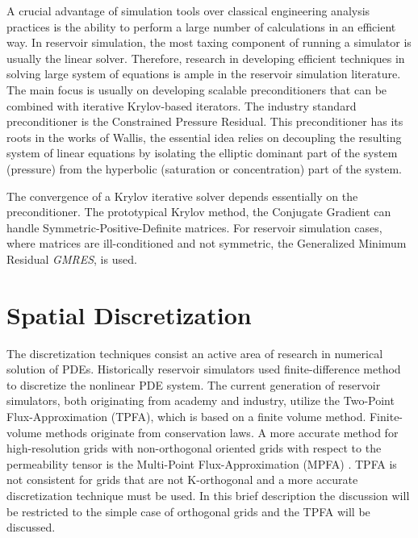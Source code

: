 A crucial advantage of simulation tools over classical engineering analysis practices is the ability
to perform a large number of calculations in an efficient way. In reservoir simulation, the most taxing
component of running a simulator is usually the linear solver. Therefore, research in developing efficient
techniques in solving large system of equations is ample in the reservoir simulation literature. The main
focus is usually on developing scalable preconditioners that can be combined with iterative Krylov-based 
iterators. The industry standard preconditioner is the Constrained Pressure Residual. This preconditioner
has its roots in the works of Wallis\supercite{Wallis_1983,Wallis_1985}, the essential idea relies on decoupling
the resulting system of linear equations by isolating the elliptic dominant part of the system (pressure) from 
the hyperbolic (saturation or concentration) part of the system. 

The convergence of a Krylov iterative solver depends essentially on the preconditioner. The prototypical Krylov method, the
Conjugate Gradient can handle Symmetric-Positive-Definite matrices. For reservoir simulation cases, where matrices are ill-conditioned and
not symmetric, the Generalized Minimum Residual \textit{GMRES}, is used\supercite{roy}. 

\section{Spatial Discretization}
The discretization techniques consist an active area of research in numerical solution of PDEs. Historically reservoir simulators used 
finite-difference method to discretize the nonlinear PDE system. The current generation of reservoir simulators, both originating from
academy and industry, utilize the Two-Point Flux-Approximation (TPFA), which is based on a finite volume method. Finite-volume methods
originate from conservation laws. A more accurate method for high-resolution grids with non-orthogonal oriented 
grids with respect to the permeability tensor is the Multi-Point Flux-Approximation (MPFA) \cite{mpfa}. TPFA is not consistent for grids
that are not K-orthogonal and a more accurate discretization technique must be used. In this brief description the discussion will be
restricted to the simple case of orthogonal grids and the TPFA will be discussed. 

